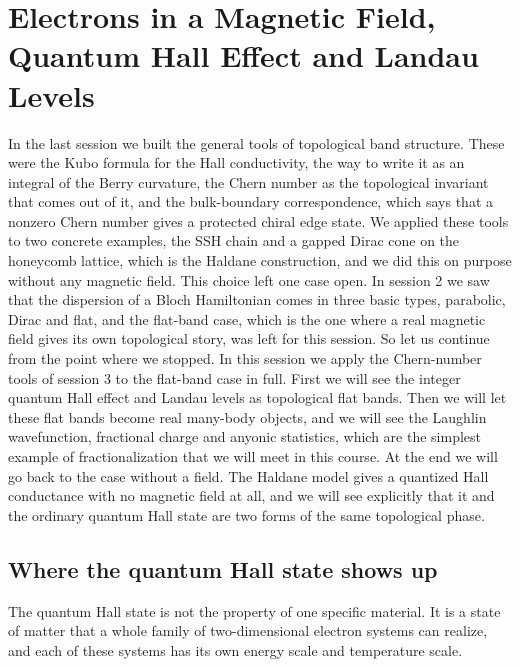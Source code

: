 \chapter{Electrons in a Magnetic Field, Quantum Hall Effect and Landau Levels}

In the last session we built the general tools of topological band structure. These were the Kubo
formula for the Hall conductivity, the way to write it as an integral of the Berry curvature, the
Chern number as the topological invariant that comes out of it, and the bulk-boundary
correspondence, which says that a nonzero Chern number gives a protected chiral edge state. We
applied these tools to two concrete examples, the SSH chain and a gapped Dirac cone on the
honeycomb lattice, which is the Haldane construction, and we did this on purpose without any
magnetic field. This choice left one case open. In session 2 we saw that the dispersion of a Bloch
Hamiltonian comes in three basic types, parabolic, Dirac and flat, and the flat-band case, which is
the one where a real magnetic field gives its own topological story, was left for this session. So
let us continue from the point where we stopped. In this session we apply the Chern-number tools of
session 3 to the flat-band case in full. First we will see the integer quantum Hall effect and
Landau levels as topological flat bands. Then we will let these flat bands become real many-body
objects, and we will see the Laughlin wavefunction, fractional charge and anyonic statistics, which
are the simplest example of fractionalization that we will meet in this course. At the end we will
go back to the case without a field. The Haldane model gives a quantized Hall conductance with no
magnetic field at all, and we will see explicitly that it and the ordinary quantum Hall state are
two forms of the same topological phase.

\section{Where the quantum Hall state shows up}

The quantum Hall state is not the property of one specific material. It is a state of matter that a whole family of two-dimensional electron systems
can realize, and each of these systems has its own energy scale and temperature scale.

